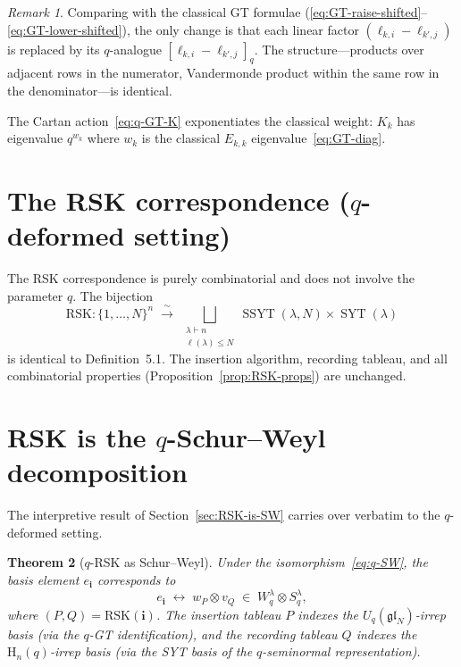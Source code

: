 \documentclass[12pt,a4paper]{article}
\newtheorem{theorem}{Theorem}[section]
\theoremstyle{definition}
\theoremstyle{remark}
\newtheorem{remark}[theorem]{Remark}
\newcommand{\gl}{\mathfrak{gl}}
\newcommand{\SYT}{\operatorname{SYT}}
\newcommand{\SSYT}{\operatorname{SSYT}}
\begin{document}
\begin{remark}
Comparing with the classical GT formulae
(\eqref{eq:GT-raise-shifted}--\eqref{eq:GT-lower-shifted}), the only
change is that each linear factor $(\ell_{k,i} - \ell_{k',j})$ is
replaced by its $q$-analogue $[\ell_{k,i} - \ell_{k',j}]_q$. The
structure---products over adjacent rows in the numerator, Vandermonde
product within the same row in the denominator---is identical.

The Cartan action~\eqref{eq:q-GT-K} exponentiates the classical
weight: $K_k$ has eigenvalue $q^{w_k}$ where $w_k$ is the classical
$E_{k,k}$ eigenvalue~\eqref{eq:GT-diag}.
\end{remark}

\section{The RSK correspondence ($q$-deformed setting)}
\label{sec:q-RSK}

The RSK correspondence is purely combinatorial and does not involve
the parameter $q$. The bijection
\[
  \mathrm{RSK} : \{1, \ldots, N\}^n
  \;\xrightarrow{\;\sim\;}\;
  \bigsqcup_{\substack{\lambda \vdash n \\ \ell(\lambda) \leqslant N}}
  \SSYT(\lambda, N) \times \SYT(\lambda)
\]
is identical to Definition~5.1. The insertion algorithm, recording
tableau, and all combinatorial properties (Proposition~\ref{prop:RSK-props})
are unchanged.

\section{RSK is the $q$-Schur--Weyl decomposition}
\label{sec:q-RSK-is-SW}

The interpretive result of Section~\ref{sec:RSK-is-SW} carries over
verbatim to the $q$-deformed setting.

\begin{theorem}[$q$-RSK as Schur--Weyl]\label{thm:q-RSK-SW}
Under the isomorphism~\eqref{eq:q-SW}, the basis element
$e_\mathbf{i}$ corresponds to
\[
  e_\mathbf{i} \;\longleftrightarrow\;
  w_P \otimes v_Q
  \;\in\; W_q^\lambda \otimes S_q^\lambda,
\]
where $(P, Q) = \mathrm{RSK}(\mathbf{i})$. The insertion tableau $P$
indexes the $U_q(\gl_N)$-irrep basis (via the $q$-GT identification),
and the recording tableau $Q$ indexes the $\mathrm{H}_n(q)$-irrep
basis (via the SYT basis of the $q$-seminormal representation).
\end{theorem}
\end{document}
